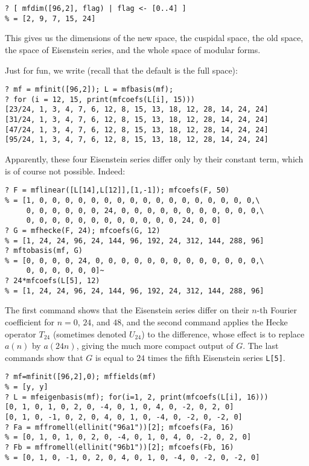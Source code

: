 \documentclass[11pt]{article}
\def\kbd#1{{\tt #1}}
\begin{document}
\begin{verbatim}
? [ mfdim([96,2], flag) | flag <- [0..4] ]
% = [2, 9, 7, 15, 24]
\end{verbatim}

This gives us the dimensions of the new space, the cuspidal space,
the old space, the space of Eisenstein series, and the whole space of
modular forms.

Just for fun, we write (recall that the default is the full space):
\begin{verbatim}
? mf = mfinit([96,2]); L = mfbasis(mf);
? for (i = 12, 15, print(mfcoefs(L[i], 15)))
[23/24, 1, 3, 4, 7, 6, 12, 8, 15, 13, 18, 12, 28, 14, 24, 24]
[31/24, 1, 3, 4, 7, 6, 12, 8, 15, 13, 18, 12, 28, 14, 24, 24]
[47/24, 1, 3, 4, 7, 6, 12, 8, 15, 13, 18, 12, 28, 14, 24, 24]
[95/24, 1, 3, 4, 7, 6, 12, 8, 15, 13, 18, 12, 28, 14, 24, 24]
\end{verbatim}

Apparently, these four Eisenstein series differ only by their constant
term, which is of course not possible. Indeed:

\begin{verbatim}
? F = mflinear([L[14],L[12]],[1,-1]); mfcoefs(F, 50)
% = [1, 0, 0, 0, 0, 0, 0, 0, 0, 0, 0, 0, 0, 0, 0, 0, 0, 0,\
     0, 0, 0, 0, 0, 0, 24, 0, 0, 0, 0, 0, 0, 0, 0, 0, 0, 0,\
     0, 0, 0, 0, 0, 0, 0, 0, 0, 0, 0, 0, 24, 0, 0]
? G = mfhecke(F, 24); mfcoefs(G, 12)
% = [1, 24, 24, 96, 24, 144, 96, 192, 24, 312, 144, 288, 96]
? mftobasis(mf, G)
% = [0, 0, 0, 0, 24, 0, 0, 0, 0, 0, 0, 0, 0, 0, 0, 0, 0, 0,\
     0, 0, 0, 0, 0, 0]~
? 24*mfcoefs(L[5], 12)
% = [1, 24, 24, 96, 24, 144, 96, 192, 24, 312, 144, 288, 96]
\end{verbatim}

The first command shows that the Eisenstein series differ on their $n$-th
Fourier coefficient for $n=0$, $24$, and $48$, and the second command applies
the Hecke operator $T_{24}$ (sometimes denoted $U_{24}$) to the difference,
whose effect is to replace $a(n)$ by $a(24n)$, giving the much more
compact output of $G$. The last commands show that $G$ is equal to
$24$ times the fifth Eisenstein series \kbd{L[5]}.

\begin{verbatim}
? mf=mfinit([96,2],0); mffields(mf)
% = [y, y]
? L = mfeigenbasis(mf); for(i=1, 2, print(mfcoefs(L[i], 16)))
[0, 1, 0, 1, 0, 2, 0, -4, 0, 1, 0, 4, 0, -2, 0, 2, 0]
[0, 1, 0, -1, 0, 2, 0, 4, 0, 1, 0, -4, 0, -2, 0, -2, 0]
? Fa = mffromell(ellinit("96a1"))[2]; mfcoefs(Fa, 16)
% = [0, 1, 0, 1, 0, 2, 0, -4, 0, 1, 0, 4, 0, -2, 0, 2, 0]
? Fb = mffromell(ellinit("96b1"))[2]; mfcoefs(Fb, 16)
% = [0, 1, 0, -1, 0, 2, 0, 4, 0, 1, 0, -4, 0, -2, 0, -2, 0]
\end{verbatim}
\end{document}
